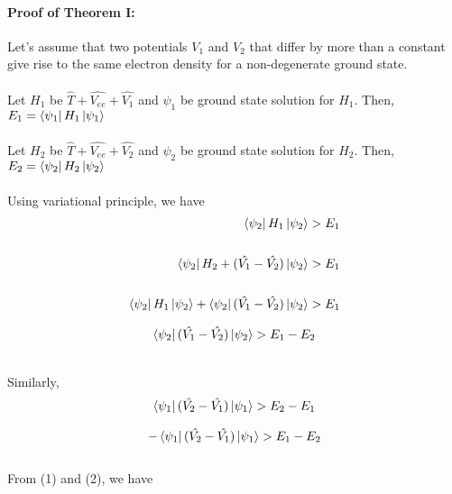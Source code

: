 \documentclass[12pt]{article}
\begin{document}
\paragraph{Proof of Theorem I:} 

Let's assume that two potentials $V_1$ and $V_2$ that differ by more than a constant give rise to the same 
electron density for a non-degenerate ground state.  
\\
\\
Let $H_1$ be $\hat{T} + \hat{V_{ee}} + \hat{V_1}$ and $\psi_1$ be ground state solution for $H_1$.
Then, $E_1 = \bra{\psi_1} H_1 \ket{\psi_1}$
\\
\\
Let $H_2$ be $\hat{T} + \hat{V_{ee}} + \hat{V_2}$ and $\psi_2$ be ground state solution for $H_2$.
Then, $E_2 = \bra{\psi_2} H_2 \ket{\psi_2}$
\\
\\
Using variational principle, we have 
\\
\begin{align*}
\bra{\psi_2}H_1 \ket{\psi_2} > E_1  \\
\\
\bra{\psi_2} H_2 + (\hat{V_1} - \hat{V_2}) \ket{\psi_2} > E_1 \\
\\
\bra{\psi_2}H_1 \ket{\psi_2} + \bra{\psi_2} (\hat{V_1} - \hat{V_2}) \ket{\psi_2} > E_1 \\
\end{align*}

\begin{equation}
    \bra{\psi_2} (\hat{V_1} - \hat{V_2}) \ket{\psi_2} > E_1 - E_2
\end{equation}

\\
Similarly, 
\begin{align*}
    \bra{\psi_1} (\hat{V_2} - \hat{V_1}) \ket{\psi_1} > E_2 - E_1\\
\end{align*}

\begin{equation}
    -\bra{\psi_1} (\hat{V_2} - \hat{V_1}) \ket{\psi_1} > E_1 - E_2
\end{equation}
\\
From (1) and (2), we have
\end{document}
